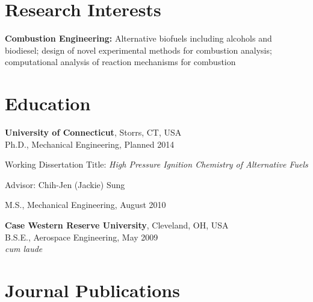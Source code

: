 \section{{\sectionfont Research Interests}}
\textbf{Combustion Engineering:} Alternative biofuels including
alcohols and biodiesel; design of novel experimental methods for
combustion analysis; computational analysis of reaction
mechanisms for combustion

\section{{\sectionfont Education}}

\textbf{University of Connecticut}, Storrs, CT, USA\\
Ph.D., Mechanical Engineering, Planned 2014
        \begin{innerlist}
        \item[] Working Dissertation Title: \textit{High Pressure
                Ignition Chemistry of Alternative Fuels}
        \item[] Advisor: Chih-Jen (Jackie) Sung
        \end{innerlist}

\vspace{0.1in}
M.S., Mechanical Engineering, August 2010

\vspace{0.2in}

\textbf{Case Western Reserve University}, Cleveland, OH, USA\\
B.S.E., Aerospace Engineering, May 2009\\
\textit{cum laude}

\section{{\sectionfont Journal Publications}}

